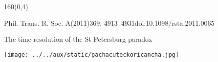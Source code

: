 \documentclass[shownotes,aspectratio=169]{beamer}
\begin{document}
\begin{frame}[plain]
 \begin{textblock}{160}(0,4)
  \centering \Large 
 \end{textblock}

 Phil. Trans. R. Soc. A(2011)369, 4913–4931doi:10.1098/rsta.2011.0065
 
 The time resolution of the St Petersburg paradox
 
 \end{frame}

\begin{frame}[plain]
\centering
  \texttt{[image: ../../aux/static/pachacuteckoricancha.jpg]}
\end{frame}
\end{document}
